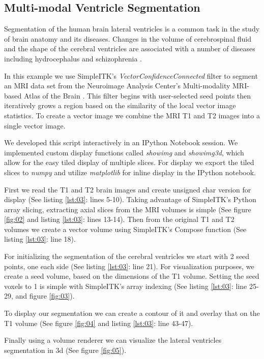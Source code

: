 \documentclass{frontiersMED} %
\begin{document}
\subsection{Multi-modal Ventricle Segmentation}
Segmentation of the human brain lateral ventricles is a common task in the
study of brain anatomy and its diseases.  Changes in the volume of
cerebrospinal fluid and the shape of the cerebral ventricles are
associated with a number of diseases including hydrocephalus
\cite{Brandt1994} and schizophrenia \cite{Staal2000}.

In this example we use SimpleITK's \textit{VectorConfidenceConnected} filter
\cite{Ibanez2005} to segment an MRI data set from the Neuroimage Analysis
Center's Multi-modality MRI-based Atlas of the Brain \cite{Halle2013}.
This filter begins with user-selected seed points then iteratively
grows a region based on the similarity of the local vector image
statistics. To create a vector image we combine the MRI T1 and T2
images into a single vector image.

We developed this script interactively in an IPython Notebook
\cite{Perez2007} session. We implemented custom display functions
called \textit{showimg} and \textit{showimg3d}, which allow for the
easy tiled display of multiple slices. For display we export the tiled slices
to \textit{numpy} and utilize \textit{matplotlib} for inline display
in the IPython notebook.

First we read the T1 and T2 brain images and create unsigned char
version for display (See listing \ref{lst:03}: lines 5-10).
Taking advantage of SimpleITK's Python array slicing, extracting
axial slices from the MRI volumes is simple (See figure \ref{fig:02}
and listing \ref{lst:03}: lines 13-14). Then from the original T1 and T2 volumes we
create a vector volume using SimpleITK's Compose function (See listing \ref{lst:03}: line 18).

For initializing the segmentation of the cerebral ventricles  we start with
2 seed points, one each side (See listing \ref{lst:03}: line 21).
For visualization purposes, we create
a seed volume, based on the dimensions of the T1 volume.  Setting the
seed voxels to 1 is simple with SimpleITK's array indexing (See listing
\ref{lst:03}: line 25-29, and figure \ref{fig:03}).

To display our segmentation we can create a contour of it and overlay
that on the T1 volume (See figure \ref{fig:04} and listing
\ref{lst:03}: line 43-47).

Finally using a volume renderer we can visualize the lateral ventricles
segmentation in 3d (See figure \ref{fig:05}).
\end{document}
